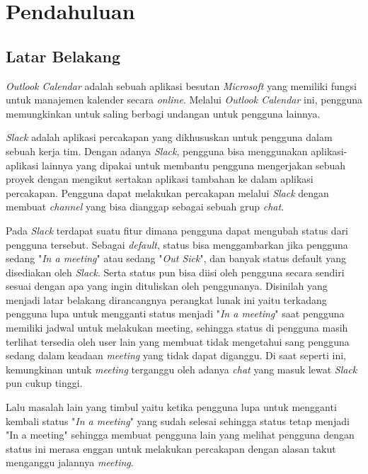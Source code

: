 \chapter{Pendahuluan}
\label{chap:intro}
   
\section{Latar Belakang}
\label{sec:label}

\textit{Outlook Calendar} adalah sebuah aplikasi besutan \textit{Microsoft} yang memiliki fungsi untuk manajemen kalender secara \textit{online}. Melalui \textit{Outlook Calendar} ini, pengguna memungkinkan untuk saling berbagi undangan untuk pengguna lainnya.  

\textit{Slack} adalah aplikasi percakapan yang dikhususkan untuk pengguna dalam sebuah kerja tim. Dengan adanya \textit{Slack}, pengguna bisa menggunakan aplikasi-aplikasi lainnya yang dipakai untuk membantu pengguna mengerjakan sebuah proyek dengan mengikut sertakan aplikasi tambahan ke dalam aplikasi percakapan. Pengguna dapat melakukan percakapan melalui \textit{Slack} dengan membuat \textit{channel} yang bisa dianggap sebagai sebuah grup \textit{chat}.

Pada \textit{Slack} terdapat suatu fitur dimana pengguna dapat mengubah status dari pengguna tersebut. Sebagai \textit{default}, status bisa menggambarkan jika pengguna sedang "\textit{In a meeting}" atau sedang "\textit{Out Sick}", dan banyak status default yang disediakan oleh \textit{Slack}. Serta status pun bisa diisi oleh pengguna secara sendiri sesuai dengan apa yang ingin dituliskan oleh penggunanya. Disinilah yang menjadi latar belakang dirancangnya perangkat lunak ini yaitu terkadang pengguna lupa untuk mengganti status menjadi "\textit{In a meeting}" saat pengguna memiliki jadwal untuk melakukan meeting, sehingga status di pengguna masih terlihat tersedia oleh user lain yang membuat tidak mengetahui sang pengguna sedang dalam keadaan \textit{meeting} yang tidak dapat diganggu. Di saat seperti ini, kemungkinan untuk \textit{meeting} terganggu oleh adanya \textit{chat} yang masuk lewat \textit{Slack} pun cukup tinggi. 

Lalu masalah lain yang timbul yaitu ketika pengguna lupa untuk mengganti kembali status "\textit{In a meeting}" yang sudah selesai sehingga status tetap menjadi "In a meeting" sehingga membuat pengguna lain yang melihat pengguna dengan status ini merasa enggan untuk melakukan percakapan dengan alasan takut menganggu jalannya \textit{meeting}. 

